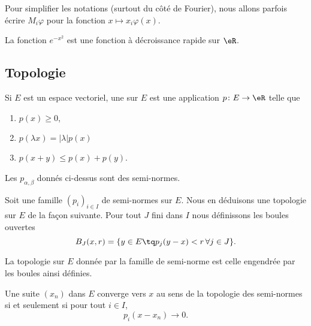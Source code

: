 Pour simplifier les notations (surtout du côté de Fourier), nous allons parfois écrire \( M_i\varphi\) pour la fonction \( x\mapsto x_i\varphi(x)\).

\begin{example}
    La fonction \(  e^{-x^2}\) est une fonction à décroissance rapide sur \( \eR\).
\end{example}

\subsection{Topologie}

\begin{definition}
    Si \( E\) est un espace vectoriel, une  sur \( E\) est une application \( p\colon E\to \eR\) telle que
    \begin{enumerate}
        \item
            \( p(x)\geq 0\),
        \item
            \( p(\lambda x)=| \lambda |p(x)\)
        \item
            \( p(x+y)\leq p(x)+p(y)\).
    \end{enumerate}
\end{definition}

\begin{lemma}
    Les \( p_{\alpha,\beta}\) donnés ci-dessus sont des semi-normes.
\end{lemma}

Soit une famille \( (p_i)_{i\in I}\) de semi-normes sur \( E\). Nous en déduisons une topologie sur \( E\) de la façon suivante\cite{SOdaAdx}. Pour tout \( J\) fini dans \( I\) nous définissons les boules ouvertes
\begin{equation}
    B_J(x,r)=\{ y\in E\tq p_j(y-x)<r\,\forall j\in J \}.
\end{equation}

La topologie sur \( E\) donnée par la famille de semi-norme est celle engendrée par les boules ainsi définies.

\begin{proposition}
    Une suite \( (x_n)\) dans \( E\) converge vers \( x\) au sens de la topologie des semi-normes si et seulement si pour tout \( i\in I\),
    \begin{equation}
        p_i(x-x_n)\to 0.
    \end{equation}
\end{proposition}

